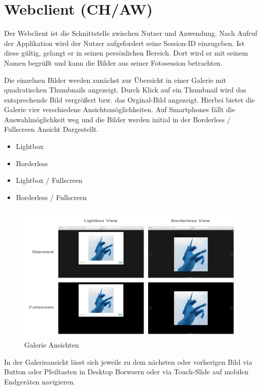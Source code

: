 \clearpage
\section{Webclient (CH/AW)}
\label{section_webclient}
Der Webclient ist die Schnittstelle zwischen Nutzer und Anwendung. Nach Aufruf der Applikation wird der Nutzer aufgefordert seine Session-ID einzugeben. Ist diese gültig, gelangt er in seinen persönlichen Bereich. Dort wird er mit seinem Namen begrüßt und kann die Bilder aus seiner Fotosession betrachten. 

Die einzelnen Bilder werden zunächst zur Übersicht in einer Galerie mit quadratischen Thumbnails angezeigt. Durch Klick auf ein Thumbnail wird das entsprechende Bild vergrößert bzw. das Orginal-Bild angezeigt. Hierbei bietet die Galerie vier verschiedene Ansichtsmöglichkeiten. Auf Smartphones fällt die Auswahlmöglichkeit weg und die Bilder werden initial in der Borderless / Fullscreen Ansicht Dargestellt. 

\begin{itemize}
	\item Lightbox
	\item Borderless
	\item Lightbox / Fullscreen
	\item Borderless / Fullscreen
\end{itemize}

\begin{figure}[h]
	\centering
	\includegraphics[width=14cm]{bilder/gallery_view}
	\caption{Galerie Ansichten}
	\label{fig_galerie_ansichten}
\end{figure}

In der Galerieansicht lässt sich jeweils zu dem nächsten oder vorherigen Bild via Button oder Pfeiltasten in Desktop Borwsern oder via Touch-Slide auf mobilen Endgeräten navigieren. 

